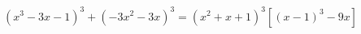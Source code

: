 \documentclass[preview]{standalone}
\begin{document}
\begin{center}
$(x^3-3x-1)^3+(-3x^2-3x)^3=(x^2+x+1)^3[(x-1)^3-9x]$
\end{center}
\end{document}
